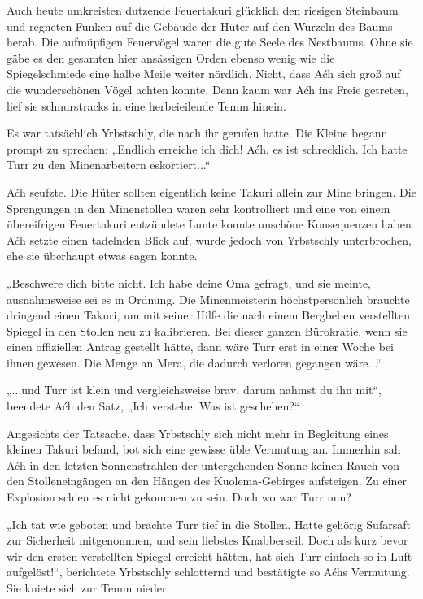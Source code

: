Auch heute umkreisten dutzende Feuertakuri glücklich den riesigen Steinbaum und regneten Funken auf die Gebäude der Hüter auf den Wurzeln des Baums herab. Die aufmüpfigen Feuervögel waren die gute Seele des Nestbaums. Ohne sie gäbe es den gesamten hier ansässigen Orden ebenso wenig wie die Spiegelschmiede eine halbe Meile weiter nördlich. Nicht, dass Aćh sich groß auf die wunderschönen Vögel achten konnte. Denn kaum war Aćh ins Freie getreten, lief sie schnurstracks in eine herbeieilende Temm hinein.

Es war tatsächlich Yrbstschly, die nach ihr gerufen hatte. Die Kleine begann prompt zu sprechen: „Endlich erreiche ich dich! Aćh, es ist schrecklich. Ich hatte Turr zu den Minenarbeitern eskortiert...“

Aćh seufzte. Die Hüter sollten eigentlich keine Takuri allein zur Mine bringen. Die Sprengungen in den Minenstollen waren sehr kontrolliert und eine von einem übereifrigen Feuertakuri entzündete Lunte konnte unschöne Konsequenzen haben. Aćh setzte einen tadelnden Blick auf, wurde jedoch von Yrbstschly unterbrochen, ehe sie überhaupt etwas sagen konnte.

„Beschwere dich bitte nicht. Ich habe deine Oma gefragt, und sie meinte, ausnahmsweise sei es in Ordnung. Die Minenmeisterin höchstpersönlich brauchte dringend einen Takuri, um mit seiner Hilfe die nach einem Bergbeben verstellten Spiegel in den Stollen neu zu kalibrieren. Bei dieser ganzen Bürokratie, wenn sie einen offiziellen Antrag gestellt hätte, dann wäre Turr erst in einer Woche bei ihnen gewesen. Die Menge an Mera, die dadurch verloren gegangen wäre...“

„...und Turr ist klein und vergleichsweise brav, darum nahmst du ihn mit“, beendete Aćh den Satz, „Ich verstehe. Was ist geschehen?“

Angesichts der Tatsache, dass Yrbstschly sich nicht mehr in Begleitung eines kleinen Takuri befand, bot sich eine gewisse üble Vermutung an. Immerhin sah Aćh in den letzten Sonnenstrahlen der untergehenden Sonne keinen Rauch von den Stolleneingängen an den Hängen des Kuolema-Gebirges aufsteigen. Zu einer Explosion schien es nicht gekommen zu sein. Doch wo war Turr nun?

„Ich tat wie geboten und brachte Turr tief in die Stollen. Hatte gehörig Sufarsaft zur Sicherheit mitgenommen, und sein liebstes Knabberseil. Doch als kurz bevor wir den ersten verstellten Spiegel erreicht hätten, hat sich Turr einfach so in Luft aufgelöst!“, berichtete Yrbstschly schlotternd und bestätigte so Aćhs Vermutung. Sie kniete sich zur Temm nieder.

